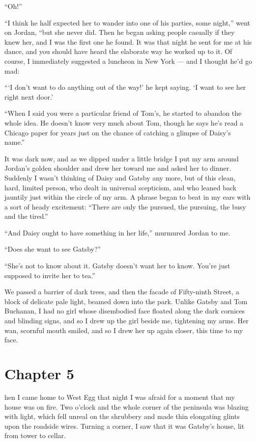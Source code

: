 \documentclass{znotebook}
\begin{document}
``Oh!''

``I think he half expected her to wander into one of his parties, some night,'' went on Jordan, ``but she never did. Then he began asking people casually if they knew her, and I was the first one he found. It was that night he sent for me at his dance, and you should have heard the elaborate way he worked up to it. Of course, I immediately suggested a luncheon in New York — and I thought he'd go mad:

``‘I don't want to do anything out of the way!' he kept saying. ‘I want to see her right next door.'

``When I said you were a particular friend of Tom's, he started to abandon the whole idea. He doesn't know very much about Tom, though he says he's read a Chicago paper for years just on the chance of catching a glimpse of Daisy's name.''

It was dark now, and as we dipped under a little bridge I put my arm around Jordan's golden shoulder and drew her toward me and asked her to dinner. Suddenly I wasn't thinking of Daisy and Gatsby any more, but of this clean, hard, limited person, who dealt in universal scepticism, and who leaned back jauntily just within the circle of my arm. A phrase began to beat in my ears with a sort of heady excitement: ``There are only the pursued, the pursuing, the busy and the tired.''

``And Daisy ought to have something in her life,'' murmured Jordan to me.

``Does she want to see Gatsby?''

``She's not to know about it. Gatsby doesn't want her to know. You're just supposed to invite her to tea.''

We passed a barrier of dark trees, and then the facade of Fifty-ninth Street, a block of delicate pale light, beamed down into the park. Unlike Gatsby and Tom Buchanan, I had no girl whose disembodied face floated along the dark cornices and blinding signs, and so I drew up the girl beside me, tightening my arms. Her wan, scornful mouth smiled, and so I drew her up again closer, this time to my face.

\chapter{Chapter 5}

\lettrine[findent=2pt]{}{ }hen I came home to West Egg that night I was afraid for a moment that my house was on fire. Two o'clock and the whole corner of the peninsula was blazing with light, which fell unreal on the shrubbery and made thin elongating glints upon the roadside wires. Turning a corner, I saw that it was Gatsby's house, lit from tower to cellar.
\end{document}
